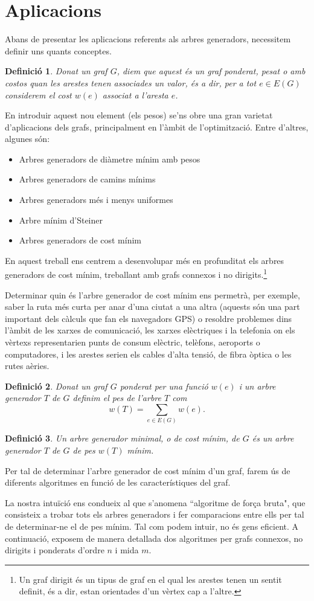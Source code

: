 \documentclass{article}
\newtheorem{definition}{Definició}[section]
\begin{document}
\section{Aplicacions}
Abans de presentar les aplicacions referents als arbres generadors, necessitem definir uns quants conceptes.
\begin{definition}
Donat un graf $G$, diem que aquest és un graf ponderat, pesat o amb costos quan les arestes tenen associades un valor, és a dir, per a tot $e\in E(G)$ considerem el cost $w(e)$ associat a l'aresta $e$.
\end{definition} 
En introduir aquest nou element (els pesos) se'ns obre una gran varietat d’aplicacions dels grafs, principalment en l’àmbit de l’optimització. Entre d'altres, algunes són:
\begin{itemize}
    \item Arbres generadors de diàmetre mínim amb pesos
    \item Arbres generadors de camins mínims
    \item Arbres generadors més i menys uniformes
    \item Arbre mínim d’Steiner
    \item Arbres generadors de cost mínim
\end{itemize}
En aquest treball ens centrem a desenvolupar més en profunditat els arbres generadors de cost mínim, treballant amb grafs connexos i no dirigits.\footnote{Un graf dirigit és un tipus de graf en el qual les arestes tenen un sentit definit, és a dir, estan orientades d'un vèrtex cap a l'altre.}\par

Determinar quin és l’arbre generador de cost mínim ens permetrà, per exemple, saber la ruta més curta per anar d’una ciutat a una altra (aquests són una part important dels càlculs que fan els navegadors GPS) o resoldre problemes dins l’àmbit de les xarxes de comunicació, les xarxes elèctriques i la telefonia on els vèrtexs representarien punts de consum elèctric, telèfons, aeroports o computadores, i les arestes serien els cables d’alta tensió, de fibra òptica o les rutes aèries.
\begin{definition}
Donat un graf $G$ ponderat per una funció $w(e)$ i un arbre generador $T$ de $G$ definim el pes de l’arbre $T$ com $$w(T)=\sum_{e\in E(G)} w(e).$$
\end{definition} 
\begin{definition}
Un arbre generador minimal, o de cost mínim, de $G$ és un arbre generador $T$ de $G$ de pes $w(T)$ mínim.
\end{definition}
Per tal de determinar l’arbre generador de cost mínim d’un graf, farem ús de diferents algoritmes en funció de les característiques del graf.\par La nostra intuïció ens condueix al que s'anomena ``algoritme de força bruta", que consisteix a trobar tots els arbres generadors i fer comparacions entre ells per tal de determinar-ne el de pes mínim. Tal com podem intuir, no és gens eficient. A continuació, exposem de manera detallada dos algoritmes per grafs connexos, no dirigits i ponderats d’ordre $n$ i mida $m$.
\end{document}
